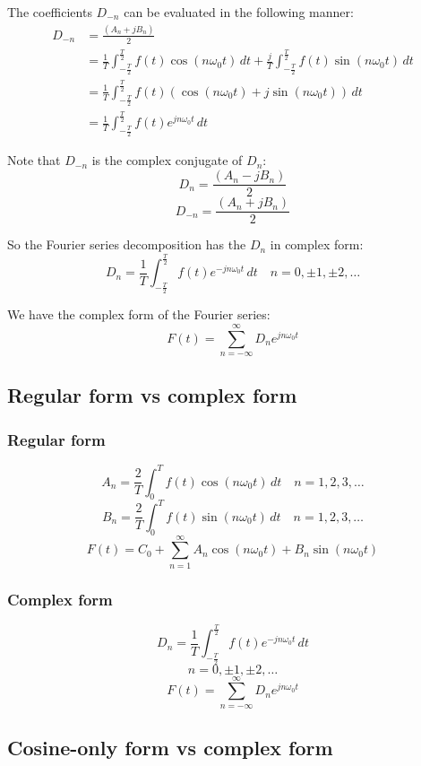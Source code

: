 \documentclass[11pt]{article}
\begin{document}
The coefficients \(D_{-n}\) can be evaluated in the following manner:
\begin{align*}
D_{-n} &= \frac{(A_n + j B_n)}{2} \\
&= \frac{1}{T} \int_{-\frac{T}{2}}^{\frac{T}{2}} f(t) \cos (n \omega_0 t) \, dt + \frac{j}{T} \int_{-\frac{T}{2}}^{\frac{T}{2}} f(t) \sin(n \omega_0 t) \, dt \\
&= \frac{1}{T} \int_{-\frac{T}{2}}^{\frac{T}{2}} f(t) (\cos (n \omega_0 t) + j \sin (n \omega_0 t)) \, dt \\
&= \frac{1}{T} \int_{-\frac{T}{2}}^{\frac{T}{2}} f(t) e^{jn \omega_0 t} \, dt
\end{align*}

Note that \(D_{-n}\) is the complex conjugate of \(D_n\):
\[D_n = \frac{(A_n - j B_n)}{2}\]
\[D_{-n} = \frac{(A_n + j B_n)}{2}\]

So the Fourier series decomposition has the \(D_n\) in complex form:
\[D_n = \frac{1}{T} \int_{- \frac{T}{2}}^{\frac{T}{2}} f(t) e^{-jn \omega_0 t} \, dt \quad n = 0, \pm 1, \pm 2, \ldots\]

We have the complex form of the Fourier series:
\[F(t) = \sum_{n = - \infty}^{\infty} D_n e^{jn \omega_0 t}\]
\subsection{Regular form vs complex form}
\label{sec:orgea36c1b}

\subsubsection{Regular form}
\label{sec:org9793a00}
\[A_n = \frac{2}{T} \int_0^T f(t) \cos (n \omega_0 t) \, dt \quad n = 1, 2, 3, \ldots\]
\[B_n = \frac{2}{T} \int_0^T f(t) \sin (n \omega_0 t) \, dt \quad n = 1, 2, 3, \ldots\]
\[F(t) = C_0 + \sum_{n = 1}^{\infty} A_n \cos (n \omega_0 t) + B_n \sin(n \omega_0 t)\]
\subsubsection{Complex form}
\label{sec:orge924d3e}
\[D_n = \frac{1}{T} \int_{-\frac{T}{2}}^{\frac{T}{2}} f(t) e^{-jn \omega_0 t} \, dt\]
\[n = 0, \pm 1, \pm 2, \ldots\]
\[F(t) = \sum_{n = - \infty}^{\infty} D_n e^{jn \omega_0 t}\]
\subsection{Cosine-only form vs complex form}
\label{sec:org7cf8ae8}
\end{document}
